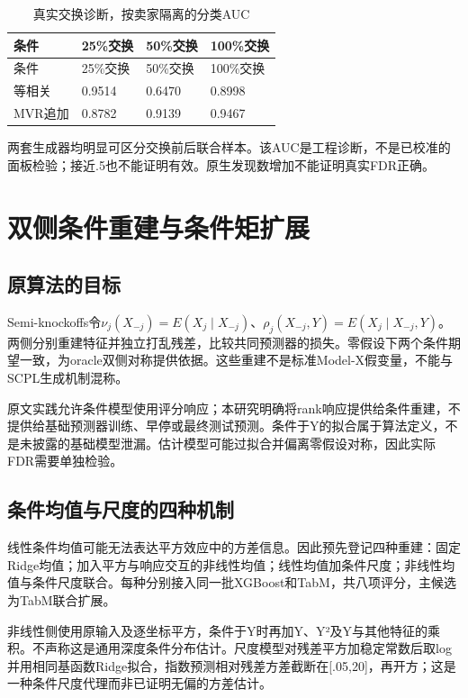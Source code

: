 \documentclass[UTF8,11pt,a4paper]{ctexart}
\begin{document}
{
\footnotesize
\begin{longtable}[]{@{}llll@{}}
\caption{真实交换诊断，按卖家隔离的分类AUC}\tabularnewline
\toprule\noalign{}
条件 & 25\%交换 & 50\%交换 & 100\%交换 \\
\midrule\noalign{}
\endfirsthead
\toprule\noalign{}
条件 & 25\%交换 & 50\%交换 & 100\%交换 \\
\midrule\noalign{}
\endhead
\bottomrule\noalign{}
\endlastfoot
等相关 & 0.9514 & 0.6470 & 0.8998 \\
MVR追加 & 0.8782 & 0.9139 & 0.9467 \\
\end{longtable}
}

两套生成器均明显可区分交换前后联合样本。该AUC是工程诊断，不是已校准的面板检验；接近.5也不能证明有效。原生发现数增加不能证明真实FDR正确。

\section{双侧条件重建与条件矩扩展}

\subsection{原算法的目标}

Semi-knockoffs令\(\nu_j(X_{-j})=E(X_j\mid X_{-j})\)、\(\rho_j(X_{-j},Y)=E(X_j\mid X_{-j},Y)\)。两侧分别重建特征并独立打乱残差，比较共同预测器的损失。零假设下两个条件期望一致，为oracle双侧对称提供依据。这些重建不是标准Model-X假变量，不能与SCPL生成机制混称。

原文实践允许条件模型使用评分响应；本研究明确将rank响应提供给条件重建，不提供给基础预测器训练、早停或最终测试预测。条件于Y的拟合属于算法定义，不是未披露的基础模型泄漏。估计模型可能过拟合并偏离零假设对称，因此实际FDR需要单独检验。

\subsection{条件均值与尺度的四种机制}

线性条件均值可能无法表达平方效应中的方差信息。因此预先登记四种重建：固定Ridge均值；加入平方与响应交互的非线性均值；线性均值加条件尺度；非线性均值与条件尺度联合。每种分别接入同一批XGBoost和TabM，共八项评分，主候选为TabM联合扩展。

非线性侧使用原输入及逐坐标平方，条件于Y时再加Y、Y²及Y与其他特征的乘积。不声称这是通用深度条件分布估计。尺度模型对残差平方加稳定常数后取log并用相同基函数Ridge拟合，指数预测相对残差方差截断在{[}.05,20{]}，再开方；这是一种条件尺度代理而非已证明无偏的方差估计。
\end{document}

